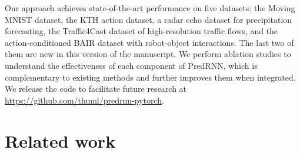 \documentclass[10pt,journal,compsoc]{IEEEtran}
\begin{document}
Our approach achieves state-of-the-art performance on five datasets: the Moving MNIST dataset, the KTH action dataset, a radar echo dataset for precipitation forecasting, the Traffic4Cast dataset of high-resolution traffic flows, and the action-conditioned BAIR dataset with robot-object interactions. The last two of them are new in this version of the manuscript.
We perform ablation studies to understand the effectiveness of each component of PredRNN, which is complementary to existing methods and further improves them when integrated.
We release the code to facilitate future research at \url{https://github.com/thuml/predrnn-pytorch}.


\section{Related work}
\end{document}
